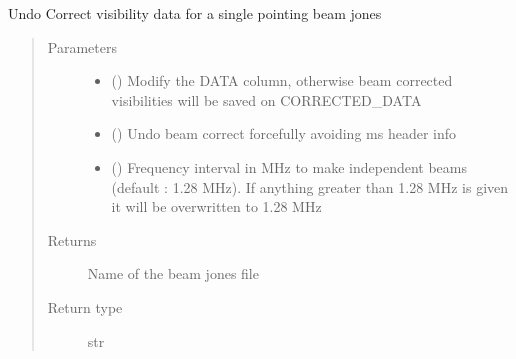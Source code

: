 \documentclass[letterpaper,10pt,english]{sphinxmanual}
\begin{document}
\begin{fulllineitems}
\begin{fulllineitems}
\begin{quote}
\begin{description}
\end{description}\end{quote}

\end{fulllineitems}


\begin{fulllineitems}
\label{\detokenize{paircars:paircars.fullpol_selfcal_LTS.PolSelfcal.uncorrect_visibility_single_beam_jones}}
\sphinxAtStartPar
Undo Correct visibility data for a single pointing beam jones
\begin{quote}\begin{description}
\item[{Parameters}] \leavevmode\begin{itemize}
\item {} 
\sphinxAtStartPar
{} () \textendash{} Modify the DATA column, otherwise beam corrected visibilities will be saved on CORRECTED\_DATA

\item {} 
\sphinxAtStartPar
{} () \textendash{} Undo beam correct forcefully avoiding ms header info

\item {} 
\sphinxAtStartPar
{} () \textendash{} Frequency interval in MHz to make independent beams (default : 1.28 MHz). If anything greater than 1.28 MHz is given it will be overwritten to 1.28 MHz

\end{itemize}

\item[{Returns}] \leavevmode
\sphinxAtStartPar
Name of the beam jones file

\item[{Return type}] \leavevmode
\sphinxAtStartPar
str


\end{description}
\end{quote}
\end{fulllineitems}
\end{fulllineitems}
\end{document}
